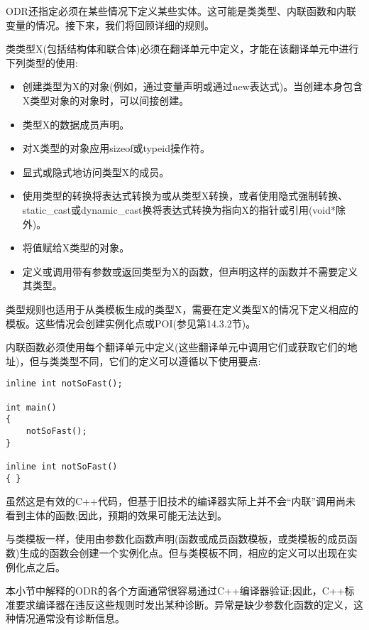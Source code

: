 ODR还指定必须在某些情况下定义某些实体。这可能是类类型、内联函数和内联变量的情况。接下来，我们将回顾详细的规则。

类类型X(包括结构体和联合体)必须在翻译单元中定义，才能在该翻译单元中进行下列类型的使用:

\begin{itemize}
\item 
创建类型为X的对象(例如，通过变量声明或通过new表达式)。当创建本身包含X类型对象的对象时，可以间接创建。

\item 
类型X的数据成员声明。

\item 
对X类型的对象应用sizeof或typeid操作符。

\item 
显式或隐式地访问类型X的成员。

\item 
使用类型的转换将表达式转换为或从类型X转换，或者使用隐式强制转换、static\_cast或dynamic\_cast换将表达式转换为指向X的指针或引用(void*除外)。

\item 
将值赋给X类型的对象。

\item 
定义或调用带有参数或返回类型为X的函数，但声明这样的函数并不需要定义其类型。
\end{itemize}

类型规则也适用于从类模板生成的类型X，需要在定义类型X的情况下定义相应的模板。这些情况会创建实例化点或POI(参见第14.3.2节)。

内联函数必须使用每个翻译单元中定义(这些翻译单元中调用它们或获取它们的地址)，但与类类型不同，它们的定义可以遵循以下使用要点:

\begin{lstlisting}[style=styleCXX]
inline int notSoFast();

int main()
{
	notSoFast();
}

inline int notSoFast()
{ }
\end{lstlisting}

虽然这是有效的C++代码，但基于旧技术的编译器实际上并不会“内联”调用尚未看到主体的函数;因此，预期的效果可能无法达到。

与类模板一样，使用由参数化函数声明(函数或成员函数模板，或类模板的成员函数)生成的函数会创建一个实例化点。但与类模板不同，相应的定义可以出现在实例化点之后。

本小节中解释的ODR的各个方面通常很容易通过C++编译器验证;因此，C++标准要求编译器在违反这些规则时发出某种诊断。异常是缺少参数化函数的定义，这种情况通常没有诊断信息。

